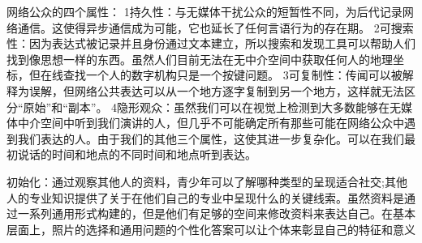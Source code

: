 网络公众的四个属性：
1持久性：与无媒体干扰公众的短暂性不同，为后代记录网络通信。这使得异步通信成为可能，它也延长了任何言语行为的存在期。
2可搜索性：因为表达式被记录并且身份通过文本建立，所以搜索和发现工具可以帮助人们找到像思想一样的东西。虽然人们目前无法在无中介空间中获取任何人的地理坐标，但在线查找一个人的数字机构只是一个按键问题。
3可复制性：传闻可以被解释为误解，但网络公共表达可以从一个地方逐字复制到另一个地方，这样就无法区分“原始”和“副本”。
4隐形观众：虽然我们可以在视觉上检测到大多数能够在无媒体中介空间中听到我们演讲的人，但几乎不可能确定所有那些可能在网络公众中遇到我们表达的人。由于我们的其他三个属性，这使其进一步复杂化。可以在我们最初说话的时间和地点的不同时间和地点听到表达。

初始化：通过观察其他人的资料，青少年可以了解哪种类型的呈现适合社交;其他人的专业知识提供了关于在他们自己的专业中呈现什么的关键线索。虽然资料是通过一系列通用形式构建的，但是他们有足够的空间来修改资料来表达自己。在基本层面上，照片的选择和通用问题的个性化答案可以让个体来彰显自己的特征和意义

